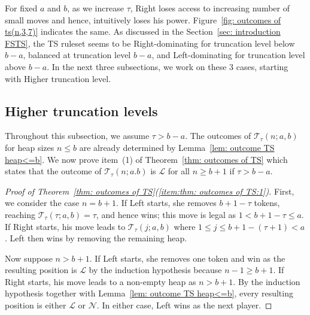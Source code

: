 \documentclass[oneside,reqno]{amsart}
\newcommand{\ts}{\mathcal{T}}
\newcommand{\lp}{\mathscr{L}}
\newcommand{\np}{\mathscr{N}}
\begin{document}
For fixed $a$ and $b$, as we increase $\tau$, Right loses access to increasing number of small moves and hence, intuitively loses his power. Figure~\ref{fig: outcomes of ts(n,3,7)} indicates the same. As discussed in the Section~\ref{sec: introduction FSTS}, the {\sc TS} ruleset seems to be Right-dominating for truncation level below $b-a$, balanced at truncation level $b-a$, and Left-dominating for truncation level above $b-a$. In the next three subsections, we work on these 3 cases, starting with Higher truncation level. 

\subsection{Higher truncation levels}\label{subsec: higher truncation level}
Throughout this subsection, we assume $\tau>b-a$. The outcomes of $\ts_\tau(n;a,b)$ for heap sizes $n\le b$ are already determined by Lemma~\ref{lem: outcome TS heap<=b}.
We now prove item~(1) of Theorem~\ref{thm: outcomes of TS} which states that the outcome of $\ts_\tau(n;a.b)$ is $\lp$ for all $n\ge b+1$ if $\tau>b-a$. 

\begin{proof}[Proof of Theorem~\ref{thm: outcomes of TS}(\ref{item:thm: outcomes of TS:1})]
    First, we consider the case $n=b+1$. If Left starts, she removes $b+1-\tau$ tokens, reaching $\ts_\tau(\tau;a,b)=\tau$, and hence wins; 
    this move is legal as $1<b+1-\tau\le a$. If Right starts, his move leads to $\ts_\tau(j;a,b)$ where $1\le j\le b+1-(\tau+1)<a$. Left then wins by removing the remaining heap. %
    
    Now suppose $n>b+1$. If Left starts, she removes one token and win as the resulting position is $\lp$ by the induction hypothesis because $n-1\ge b+1$. If Right starts, his move leads to a non-empty heap as $n>b+1$. By the induction hypothesis together with Lemma~\ref{lem: outcome TS heap<=b}, every resulting position is either $\lp$ or $\np$. In either case, Left wins as the next player.
\end{proof}
\end{document}
